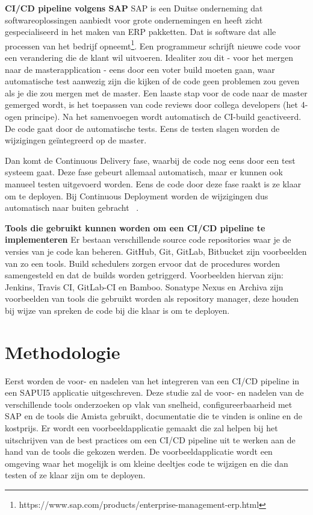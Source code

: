 \large{\textbf{CI/CD pipeline volgens SAP}}
\newline{}
SAP is een Duitse onderneming dat softwareoplossingen aanbiedt voor grote ondernemingen en heeft zicht gespecialiseerd in het maken van ERP pakketten. Dat is software dat alle processen van het bedrijf opneemt\footnote{https://www.sap.com/products/enterprise-management-erp.html}.
Een programmeur schrijft nieuwe code voor een verandering die de klant wil uitvoeren. Idealiter zou dit - voor het mergen naar de masterapplication - eens door een voter build moeten gaan, waar automatische test aanwezig zijn die kijken of de code geen problemen zou geven als je die zou mergen met de master. Een laaste stap voor de code naar de master gemerged wordt, is het toepassen van code reviews door collega developers (het 4-ogen principe).
Na het samenvoegen wordt automatisch de CI-build geactiveerd. De code gaat door de automatische tests. Eens de testen slagen worden de wijzigingen geïntegreerd op de master. 

Dan komt de Continuous Delivery fase, waarbij de code nog eens door een test systeem gaat. Deze fase gebeurt allemaal automatisch, maar er kunnen ook manueel testen uitgevoerd worden. Eens de code door deze fase raakt is ze klaar om te deployen. 
Bij Continuous Deployment worden de wijzigingen dus automatisch naar buiten gebracht ~\autocite{Kramer2018}.

\large{\textbf{Tools die gebruikt kunnen worden om een CI/CD pipeline te implementeren}}
    \newline
    Er bestaan verschillende source code repositories waar je de versies van je code kan beheren. GitHub, Git, GitLab, Bitbucket zijn voorbeelden van zo een tools.
    Build schedulers zorgen ervoor dat de procedures worden samengesteld en dat de builds worden getriggerd. Voorbeelden hiervan zijn: Jenkins, Travis CI, GitLab-CI en Bamboo. Sonatype Nexus en Archiva zijn voorbeelden van tools die gebruikt worden als repository manager, deze houden bij wijze van spreken de code bij die klaar is om te deployen.
    
    \section{Methodologie}
    \label{sec:methodologie}
    
    Eerst worden de voor- en nadelen van het integreren van een CI/CD pipeline in een SAPUI5 applicatie uitgeschreven. 
    Deze studie zal de voor- en nadelen van de verschillende tools onderzoeken op vlak van snelheid, configureerbaarheid met SAP en de tools die Amista gebruikt, documentatie die te vinden is online en de kostprijs.
    Er wordt een voorbeeldapplicatie gemaakt die zal helpen bij het uitschrijven van de best practices om een CI/CD pipeline uit te werken aan de hand van de tools die gekozen werden.
    De voorbeeldapplicatie wordt een omgeving waar het mogelijk is om kleine deeltjes code te wijzigen en die dan testen of ze klaar zijn om te deployen.
    

